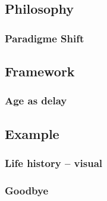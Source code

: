\documentclass{beamer}
\begin{document}
\subsection{Philosophy}
\begin{frame}
    \frametitle{Paradigme Shift}
    
\end{frame}

\subsection{Framework}

\begin{frame}
    \frametitle{Age as delay}
    
\end{frame}

\subsection{Example}
\begin{frame}
    \frametitle{Life history -- visual}
    
\end{frame}

\begin{frame}
    \frametitle{Goodbye}
    
\end{frame}
\end{document}
